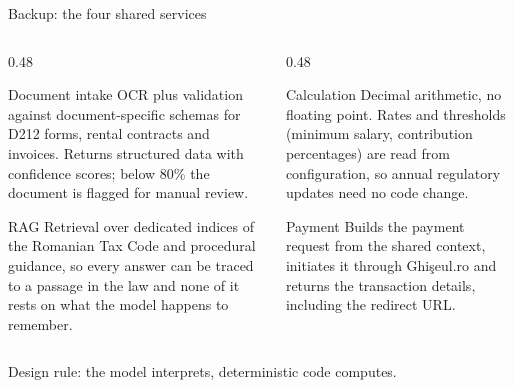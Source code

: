 \documentclass[aspectratio=169,10pt]{beamer}
\newcommand{\cmt}[1]{{\color{stone}\small #1}}          %
\begin{document}
\begin{frame}[noframenumbering]{Backup: the four shared services}
  \begin{columns}[T]
    \begin{column}{0.48\textwidth}
      \begin{block}{Document intake}
        \small OCR plus validation against document-specific schemas for D212 forms, rental
        contracts and invoices. Returns structured data with confidence scores; below 80\%
        the document is flagged for manual review.
      \end{block}
      \begin{block}{RAG}
        \small Retrieval over dedicated indices of the Romanian Tax Code and procedural
        guidance, so every answer can be traced to a passage in the law and none of it rests
        on what the model happens to remember.
      \end{block}
    \end{column}
    \begin{column}{0.48\textwidth}
      \begin{block}{Calculation}
        \small Decimal arithmetic, no floating point. Rates and thresholds (minimum salary,
        contribution percentages) are read from configuration, so annual regulatory updates
        need no code change.
      \end{block}
      \begin{block}{Payment}
        \small Builds the payment request from the shared context, initiates it through
        Ghi\c{s}eul.ro and returns the transaction details, including the redirect URL.
      \end{block}
    \end{column}
  \end{columns}
  \vfill
  \cmt{Design rule: the model interprets, deterministic code computes.}
\end{frame}
\end{document}
